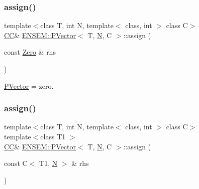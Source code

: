 \subsubsection{\texorpdfstring{assign()}{assign()}\hspace{0.1cm}{\footnotesize\ttfamily [3/6]}}
{\footnotesize\ttfamily template$<$class T, int N, template$<$ class, int $>$ class C$>$ \\
\mbox{\hyperlink{classENSEM_1_1PVector_a92dc0a0a301a3dc96f7be5d337019bc7}{CC}}\& \mbox{\hyperlink{classENSEM_1_1PVector}{E\+N\+S\+E\+M\+::\+P\+Vector}}$<$ T, \mbox{\hyperlink{adat__devel_2lib_2hadron_2operator__name__util_8cc_a7722c8ecbb62d99aee7ce68b1752f337}{N}}, C $>$\+::assign (\begin{DoxyParamCaption}\item[{const \mbox{\hyperlink{structENSEM_1_1Zero}{Zero}} \&}]{rhs }\end{DoxyParamCaption})\hspace{0.3cm}{\ttfamily [inline]}}



\mbox{\hyperlink{classENSEM_1_1PVector}{P\+Vector}} = zero. 

\mbox{\label{classENSEM_1_1PVector_ab908e56421fdbff29813fb8bdaecdb6f}} 
\subsubsection{\texorpdfstring{assign()}{assign()}\hspace{0.1cm}{\footnotesize\ttfamily [4/6]}}
{\footnotesize\ttfamily template$<$class T, int N, template$<$ class, int $>$ class C$>$ \\
template$<$class T1 $>$ \\
\mbox{\hyperlink{classENSEM_1_1PVector_a92dc0a0a301a3dc96f7be5d337019bc7}{CC}}\& \mbox{\hyperlink{classENSEM_1_1PVector}{E\+N\+S\+E\+M\+::\+P\+Vector}}$<$ T, \mbox{\hyperlink{adat__devel_2lib_2hadron_2operator__name__util_8cc_a7722c8ecbb62d99aee7ce68b1752f337}{N}}, C $>$\+::assign (\begin{DoxyParamCaption}\item[{const C$<$ T1, \mbox{\hyperlink{adat__devel_2lib_2hadron_2operator__name__util_8cc_a7722c8ecbb62d99aee7ce68b1752f337}{N}} $>$ \&}]{rhs }\end{DoxyParamCaption})\hspace{0.3cm}{\ttfamily [inline]}}



